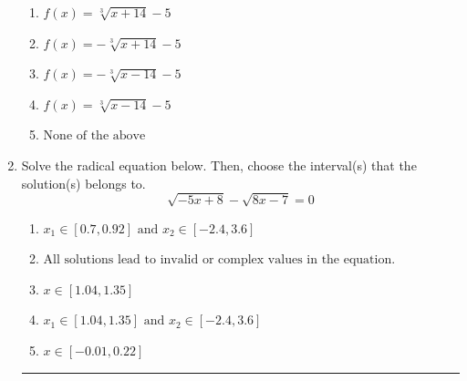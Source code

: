 \documentclass[14pt]{extbook}
\newcommand{\litem}[1]{\item#1\hspace*{-1cm}\rule{\textwidth}{0.4pt}}
\begin{document}
\begin{enumerate}
{\begin{center}
\end{center}
\begin{enumerate}[label=\Alph*.]
\item \( f(x) = \sqrt[3]{x + 14} - 5 \)
\item \( f(x) = - \sqrt[3]{x + 14} - 5 \)
\item \( f(x) = - \sqrt[3]{x - 14} - 5 \)
\item \( f(x) = \sqrt[3]{x - 14} - 5 \)
\item \( \text{None of the above} \)

\end{enumerate} }
\litem{
Solve the radical equation below. Then, choose the interval(s) that the solution(s) belongs to.\[ \sqrt{-5 x + 8} - \sqrt{8 x - 7} = 0 \]\begin{enumerate}[label=\Alph*.]
\item \( x_1 \in [0.7, 0.92] \text{ and } x_2 \in [-2.4,3.6] \)
\item \( \text{All solutions lead to invalid or complex values in the equation.} \)
\item \( x \in [1.04,1.35] \)
\item \( x_1 \in [1.04, 1.35] \text{ and } x_2 \in [-2.4,3.6] \)
\item \( x \in [-0.01,0.22] \)


\end{enumerate}}
\end{enumerate}
\end{document}
